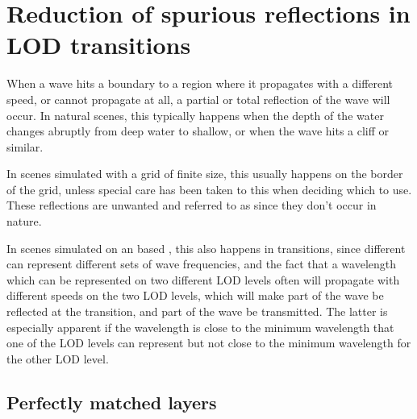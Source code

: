 

\section{Reduction of spurious reflections in LOD transitions}

When a wave hits a boundary to a region where it propagates with a different speed, or cannot propagate at all, a partial or total reflection of the wave will occur. In natural scenes, this typically happens when the depth of the water changes abruptly from deep water to shallow, or when the wave hits a cliff or similar.

In scenes simulated with a grid of finite size, this usually happens on the border of the grid, unless special care has been taken to this when deciding which  to use. These reflections are unwanted and referred to as  since they don't occur in nature.

In scenes simulated on an \octree based \grid, this also happens in \LOD transitions, since different  can represent different sets of wave frequencies, and the fact that a wavelength which can be represented on two different LOD levels often will propagate with different speeds on the two LOD levels, which will make part of the wave be reflected at the transition, and part of the wave be transmitted. The latter is especially apparent if the wavelength is close to the minimum wavelength that one of the LOD levels can represent but not close to the minimum wavelength for the other LOD level.


\subsection{Perfectly matched layers}

